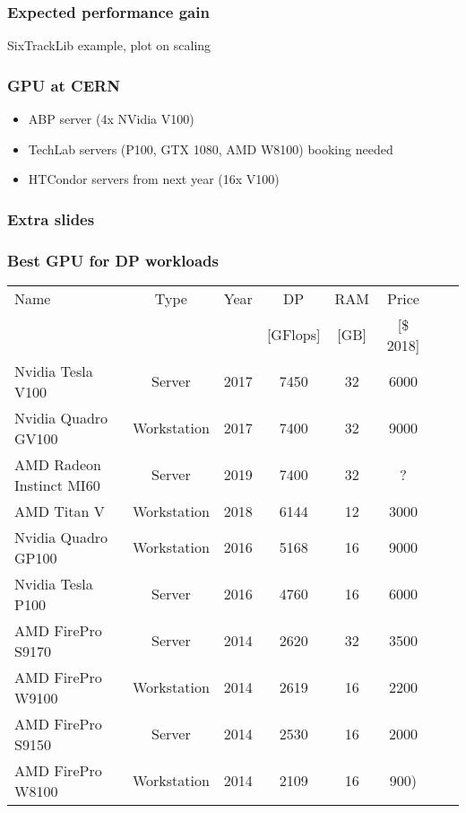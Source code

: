 \documentclass{beamer}
\begin{document}
\begin{frame}
\frametitle{Expected performance gain}
SixTrackLib example, plot on scaling
\end{frame}

\begin{frame}
\frametitle{GPU at CERN}
\begin{itemize}
    \item ABP server (4x NVidia V100)
    \item TechLab servers (P100, GTX 1080, AMD W8100) booking needed
    \item HTCondor servers from next year (16x V100)
\end{itemize}

\end{frame}

\begin{frame}
\frametitle{Extra slides}
\end{frame}


\begin{frame}
\frametitle{Best GPU for DP workloads}

\footnotesize
\begin{tabular}{|l|c|c|c|c|c|c|c|}
\hline
Name &  Type & Year & DP & RAM & Price \\
  &    &   & [GFlops] & [GB] & [\$ 2018] \\\hline
Nvidia Tesla V100 & Server & 2017 & 7450 & 32 & 6000\\
Nvidia Quadro GV100 & Workstation & 2017 & 7400 & 32 & 9000\\
AMD Radeon Instinct MI60 & Server& 2019 & 7400 & 32 & ? \\
AMD Titan V & Workstation & 2018 & 6144 & 12 & 3000\\
Nvidia Quadro GP100 & Workstation & 2016 & 5168 & 16 & 9000\\
Nvidia Tesla P100 & Server & 2016 & 4760 & 16 & 6000\\
AMD FirePro S9170 & Server & 2014 &  2620 & 32& 3500\\
AMD FirePro W9100 & Workstation & 2014 & 2619 & 16 & 2200\\
AMD FirePro S9150 & Server & 2014 &  2530 & 16 & 2000\\
AMD FirePro W8100 & Workstation & 2014 & 2109 & 16 & 900)\\
\hline
\end{tabular}

\end{frame}
\end{document}
